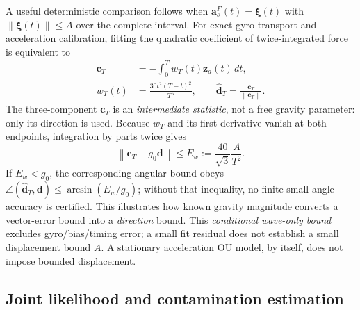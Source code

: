 \documentclass[conference]{IEEEtran}
\DeclareRobustCommand{\vct}[1]{\bm{#1}}
\newcommand{\norm}[1]{\left\lVert#1\right\rVert}
\begin{document}
A useful deterministic comparison follows when
$\vct a_s^F(t)=\ddot{\vct\xi}(t)$ with
$\norm{\vct\xi(t)}\le A$ over the complete interval.  For exact
gyro transport and acceleration calibration, fitting the quadratic
coefficient of twice-integrated force is equivalent to
\begin{equation}
\begin{aligned}
\vct c_T&=-\int_0^T w_T(t)\vct z_a(t)\,dt,\\
w_T(t)&=\frac{30t^2(T-t)^2}{T^5},\qquad
\hat{\vct d}_{T}=\frac{\vct c_T}{\norm{\vct c_T}}.
\end{aligned}
\label{eq:joint-acc-weights}
\end{equation}
The three-component $\vct c_T$ is an \emph{intermediate
statistic}, not a free gravity parameter: only its direction is used.
Because $w_T$ and its first derivative vanish at both endpoints,
integration by parts twice gives
\begin{equation}
\norm{\vct c_T-g_0\vct d}
 \le E_w:=\frac{40}{\sqrt{3}}\frac{A}{T^2}.
\label{eq:joint-wave-bound}
\end{equation}
If $E_w<g_0$, the corresponding angular bound obeys
$\angle(\hat{\vct d}_T,\vct d)\le
\arcsin(E_w/g_0)$; without that inequality, no finite
small-angle accuracy is certified.  This illustrates how known
gravity magnitude converts a vector-error bound into a
\emph{direction} bound.
This \emph{conditional wave-only bound} excludes gyro/bias/timing
error; a small fit residual does not establish a small displacement
bound $A$.  A stationary acceleration OU model, by itself, does
not impose bounded displacement.

\subsection{Joint likelihood and contamination estimation}
\end{document}
